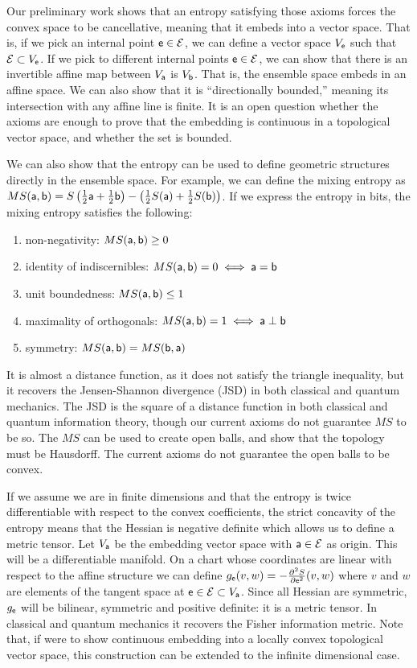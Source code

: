 Our preliminary work shows that an entropy satisfying those axioms forces the convex space to be cancellative, meaning that it embeds into a vector space. That is, if we pick an internal point $\ens \in \Ens$, we can define a vector space $V_{\ens}$ such that $\Ens \subset V_{\ens}$. If we pick to different internal points $\ens \in \Ens$, we can show that there is an invertible affine map between $V_{\ens[a]}$ is $V_{\ens[b]}$. That is, the ensemble space embeds in an affine space. We can also show that it is ``directionally bounded,'' meaning its intersection with any affine line is finite. It is an open question whether the axioms are enough to prove that the embedding is continuous in a topological vector space, and whether the set is bounded.

We can also show that the entropy can be used to define geometric structures directly in the ensemble space. For example, we can define the mixing entropy as $MS(\ens[a], \ens[b]) = S\left(\frac{1}{2}\ens[a] + \frac{1}{2} \ens[b]\right) - \left(\frac{1}{2} S(\ens[a]) + \frac{1}{2} S(\ens[b])\right)$. If we express the entropy in bits, the mixing entropy satisfies the following:
\begin{enumerate}
	\item non-negativity: $MS(\ens[a], \ens[b]) \geq 0$
	\item identity of indiscernibles: $MS(\ens[a], \ens[b]) = 0 \iff \ens[a]=\ens[b]$
	\item unit boundedness: $MS(\ens[a], \ens[b]) \leq 1$
	\item maximality of orthogonals: $MS(\ens[a], \ens[b]) = 1 \iff \ens[a] \ortho \ens[b]$
	\item symmetry: $MS(\ens[a], \ens[b]) = MS(\ens[b], \ens[a])$
\end{enumerate}
It is almost a distance function, as it does not satisfy the triangle inequality, but it recovers the Jensen-Shannon divergence (JSD) in both classical and quantum mechanics. The JSD is the square of a distance function in both classical and quantum information theory, though our current axioms do not guarantee $MS$ to be so. The $MS$ can be used to create open balls, and show that the topology must be Hausdorff. The current axioms do not guarantee the open balls to be convex.

If we assume we are in finite dimensions and that the entropy is twice differentiable with respect to the convex coefficients, the strict concavity of the entropy means that the Hessian is negative definite which allows us to define a metric tensor. Let $V_{\ens[a]}$ be the embedding vector space with $\ens[a] \in \Ens$ as origin. This will be a differentiable manifold. On a chart whose coordinates are linear with respect to the affine structure we can define $g_{\ens}( v, w ) = - \frac{\partial^2 S}{\partial \ens ^2}( v, w )$ where $v$ and $w$ are elements of the tangent space at $\ens \in \Ens \subset V_{\ens[a]}$. Since all Hessian are symmetric, $g_{\ens}$ will be bilinear, symmetric and positive definite: it is a metric tensor. In classical and quantum mechanics it recovers the Fisher information metric. Note that, if were to show continuous embedding into a locally convex topological vector space, this construction can be extended to the infinite dimensional case.

